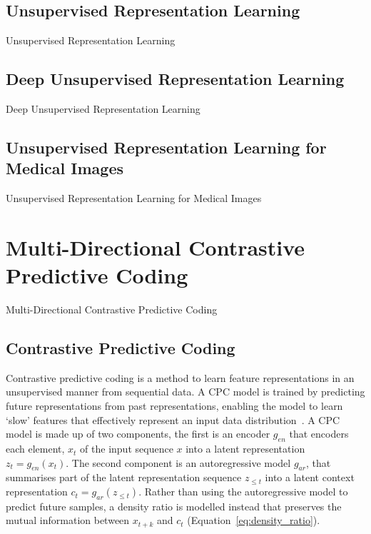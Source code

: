 \subsection{Unsupervised Representation Learning}
\label{subsec:unsupervised_representation}
Unsupervised Representation Learning

\subsection{Deep Unsupervised Representation Learning}
\label{subsec:unsupervised_deep_representation}
Deep Unsupervised Representation Learning

\subsection{Unsupervised Representation Learning for Medical Images}
\label{subsec:unsupervise_representation_for_medical}
Unsupervised Representation Learning for Medical Images



\section{Multi-Directional Contrastive Predictive Coding}
\label{sec:unsupervised_multi_directional_cpc}
Multi-Directional Contrastive Predictive Coding

\subsection{Contrastive Predictive Coding}
\label{subsec:unsupervised_cpc}
Contrastive predictive coding is a method to learn feature representations in an unsupervised manner from sequential data. A CPC model is trained by predicting future representations from past representations, enabling the model to learn ‘slow’ features that effectively represent an input data distribution~\citep{henaff2019data,oord2018representation}. A CPC model is made up of two components, the first is an encoder $g_{en}$ that encoders each element, $x_t$ of the input sequence $x$ into a latent representation $z_t = g_{en}(x_t)$. The second component is an autoregressive model $g_{ar}$, that summarises part of the latent representation sequence $z_{\le t}$ into a latent context representation $c_t = g_{ar}(z_{\le t})$. Rather than using the autoregressive model to predict future samples, a density ratio is modelled instead that preserves the mutual information between $x_{t+k}$ and $c_t$ (Equation~\ref{eq:density_ratio}).

